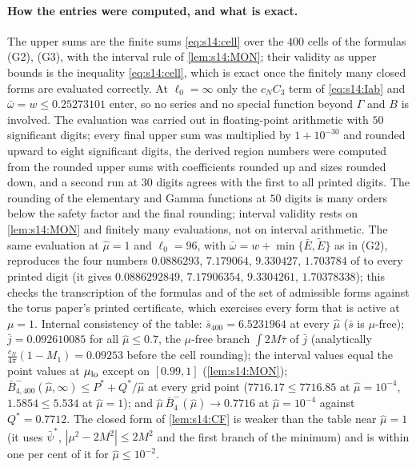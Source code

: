 \paragraph{How the entries were computed, and what is exact.} The upper sums are the finite sums \eqref{eq:s14:cell} over the $400$ cells of the formulas (G2), (G3), with the interval rule of \cref{lem:s14:MON}; their validity as upper bounds is the inequality \eqref{eq:s14:cell}, which is exact once the finitely many closed forms are evaluated correctly. At $\ell_0=\infty$ only the $c_NC_3$ term of \eqref{eq:s14:Iab} and $\bar\omega=w\le0.25273101$ enter, so no series and no special function beyond $\Gamma$ and $B$ is involved. The evaluation was carried out in floating-point arithmetic with $50$ significant digits; every final upper sum was multiplied by $1+10^{-30}$ and rounded upward to eight significant digits, the derived region numbers were computed from the rounded upper sums with coefficients rounded up and sizes rounded down, and a second run at $30$ digits agrees with the first to all printed digits. The rounding of the elementary and Gamma functions at $50$ digits is many orders below the safety factor and the final rounding; interval validity rests on \cref{lem:s14:MON} and finitely many evaluations, not on interval arithmetic. The same evaluation at $\hat\mu=1$ and $\ell_0=96$, with $\bar\omega=w+\min\{\bar E,\tilde E\}$ as in (G2), reproduces the four numbers $0.0886293$, $7.179064$, $9.330427$, $1.703784$ of \cite[Cor.~G.4]{SymPhase} to every printed digit (it gives $0.0886292849$, $7.17906354$, $9.3304261$, $1.70378338$); this checks the transcription of the formulas and of the set of admissible forms against the torus paper's printed certificate, which exercises every form that is active at $\mu=1$. Internal consistency of the table: $\bar s_{400}=6.5231964$ at every $\hat\mu$ ($\bar s$ is $\mu$-free); $\bar j=0.092610085$ for all $\hat\mu\le0.7$, the $\mu$-free branch $\int2M\bar\tau$ of $\bar j$ (analytically $\frac{c_N}{4\pi}(1-M_1)=0.09253$ before the cell rounding); the interval values equal the point values at $\mu_{\rm lo}$ except on $[0.99,1]$ (\cref{lem:s14:MON}); $\bar B^-_{4,400}(\hat\mu,\infty)\le P^*+Q^*/\hat\mu$ at every grid point ($7716.17\le7716.85$ at $\hat\mu=10^{-4}$, $1.5854\le5.534$ at $\hat\mu=1$); and $\hat\mu\,\bar B_4^-(\hat\mu)\to0.7716$ at $\hat\mu=10^{-4}$ against $Q^*=0.7712$. The closed form of \cref{lem:s14:CF} is weaker than the table near $\hat\mu=1$ (it uses $\bar\psi^*$, $|\mu^2-2M^2|\le2M^2$ and the first branch of the minimum) and is within one per cent of it for $\hat\mu\le10^{-2}$.
